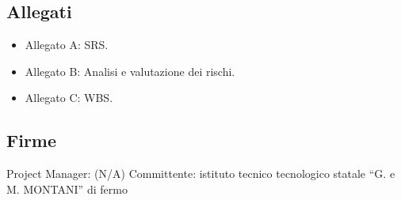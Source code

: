 \documentclass{article}
\begin{document}
\begin{flushleft}
		\subsection{Allegati}
		\begin{itemize}
			\item Allegato A: SRS.
			\item Allegato B: Analisi e valutazione dei rischi.
			\item Allegato C: WBS.
		\end{itemize}
		\subsection{Firme}
		Project Manager: (N/A)
		Committente: istituto tecnico tecnologico statale “G. e M. MONTANI” di fermo
		
	\end{flushleft}
	
	
\end{document}
